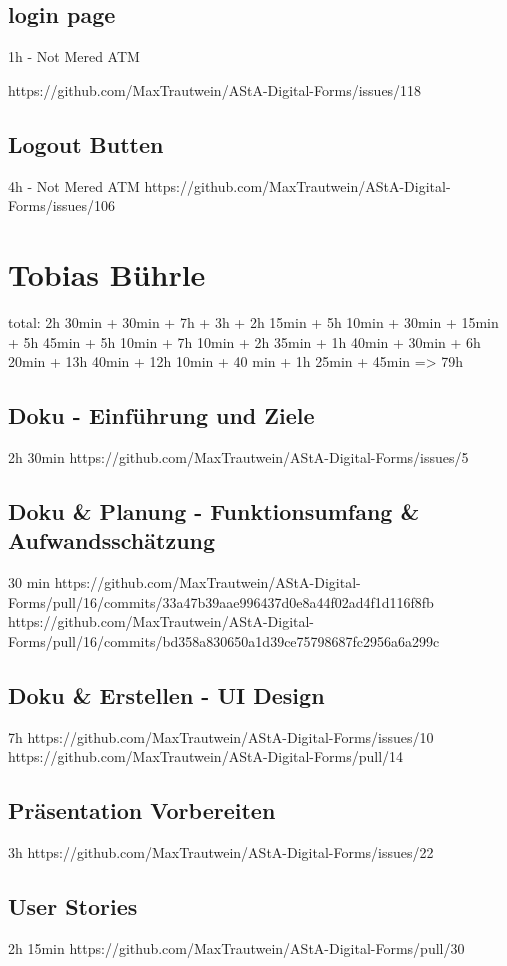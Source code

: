 \subsection{login page}
1h - Not Mered ATM

https://github.com/MaxTrautwein/AStA-Digital-Forms/issues/118
\subsection{Logout Butten}
4h - Not Mered ATM
https://github.com/MaxTrautwein/AStA-Digital-Forms/issues/106


\section{Tobias Bührle}\label{sec:tobias-buhrle}

total: 2h 30min + 30min + 7h + 3h + 2h 15min + 5h 10min + 30min + 15min + 5h 45min + 5h 10min + 7h 10min
+ 2h 35min + 1h 40min + 30min + 6h 20min + 13h 40min + 12h 10min + 40 min + 1h 25min + 45min
=> 79h

\subsection{Doku - Einführung und Ziele}
2h 30min
https://github.com/MaxTrautwein/AStA-Digital-Forms/issues/5

\subsection{Doku & Planung - Funktionsumfang & Aufwandsschätzung}
30 min
https://github.com/MaxTrautwein/AStA-Digital-Forms/pull/16/commits/33a47b39aae996437d0e8a44f02ad4f1d116f8fb
https://github.com/MaxTrautwein/AStA-Digital-Forms/pull/16/commits/bd358a830650a1d39ce75798687fc2956a6a299c

\subsection{Doku & Erstellen - UI Design}
7h
https://github.com/MaxTrautwein/AStA-Digital-Forms/issues/10
https://github.com/MaxTrautwein/AStA-Digital-Forms/pull/14

\subsection{Präsentation Vorbereiten}
3h
https://github.com/MaxTrautwein/AStA-Digital-Forms/issues/22
\subsection{User Stories}
2h 15min
https://github.com/MaxTrautwein/AStA-Digital-Forms/pull/30

